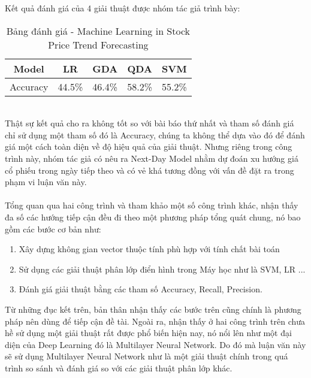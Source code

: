 Kết quả đánh giá của 4 giải thuật được nhóm tác giả trình bày:
\begin{table}[h]
\centering
\begin{tabular}{ |c|c|c|c|c| }
\hline
Model & LR & GDA & QDA & SVM \\
\hline
Accuracy & 44.5\% & 46.4\% & 58.2\% & 55.2\% \\
\hline
\end{tabular}
\caption{Bảng đánh giá - Machine Learning in Stock Price Trend Forecasting }
\end{table}\\
Thật sự kết quả cho ra không tốt so với bài báo thứ nhất và tham số đánh giá 
chỉ sử dụng một tham số đó là Accuracy, chúng ta không thể dựa vào đó để đánh giá 
một cách toàn diện về độ hiệu quả của giải thuật. Nhưng riêng trong công trình 
này, nhóm tác giả có nêu ra Next-Day Model nhằm dự đoán xu hướng giá cổ phiếu 
trong ngày tiếp theo và có vẻ khá tương đồng với vấn đề đặt ra trong phạm vi 
luận văn này.\\\\
Tổng quan qua hai công trình và tham khảo một số công trình khác, nhận thấy 
đa số các hướng tiếp cận đều đi theo một phương pháp tổng quát chung, nó bao gồm các bước 
cơ bản như:
\begin{enumerate}
\item Xây dựng không gian vector thuộc tính phù hợp với tính chất bài toán
\item Sử dụng các giải thuật phân lớp điển hình trong Máy học như là 
SVM, LR ...
\item Đánh giá giải thuật bằng các tham số Accuracy, Recall, Precision.
\end{enumerate}
Từ những đục kết trên, bản thân nhận thấy các bước trên cũng chính là phương pháp 
nên dùng để tiếp cận đề tài. Ngoài ra, nhận thấy ở hai công trình trên chưa 
hề sử dụng một giải thuật rất được phổ biến hiện nay, nó nổi lên như một đại 
diện của Deep Learning đó là Multilayer Neural Network. Do đó mà luận văn này sẽ sử dụng 
Multilayer Neural Network như là một giải thuật chính trong quá trình so sánh 
và đánh giá so với các giải thuật phân lớp khác.
